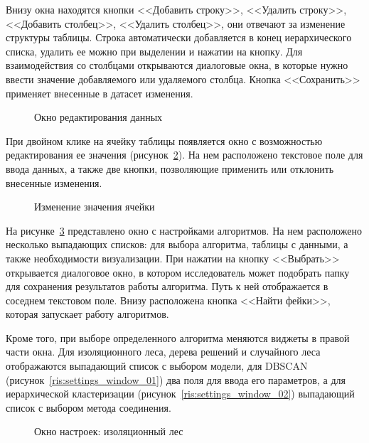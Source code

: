 Внизу окна находятся кнопки <<Добавить строку>>, <<Удалить строку>>, <<Добавить столбец>>, <<Удалить столбец>>, они отвечают за изменение структуры таблицы. Строка автоматически добавляется в конец иерархического списка, удалить ее можно при выделении и нажатии на кнопку. Для взаимодействия со столбцами открываются диалоговые окна, в которые нужно ввести значение добавляемого или удаляемого столбца. Кнопка <<Сохранить>> применяет внесенные в датасет изменения. 

\begin{figure}[H]
    \caption{Окно редактирования данных}
    \label{ris:edit_window}
\end{figure}


При двойном клике на ячейку таблицы появляется окно с возможностью редактирования ее значения (рисунок~\ref{ris:edit_cell}). На нем расположено текстовое поле для ввода данных, а также две кнопки, позволяющие применить или отклонить внесенные изменения.


\begin{figure}[H]
    \caption{Изменение значения ячейки}
    \label{ris:edit_cell}
\end{figure}


На рисунке~\ref{ris:settings_window} представлено окно с настройками алгоритмов. На нем расположено несколько выпадающих списков: для выбора алгоритма, таблицы с данными, а также необходимости визуализации. При нажатии на кнопку <<Выбрать>> открывается диалоговое окно, в котором исследователь может подобрать папку для сохранения результатов работы алгоритма. Путь к ней отображается в соседнем текстовом поле. Внизу расположена кнопка <<Найти фейки>>, которая запускает работу алгоритмов.

Кроме того, при выборе определенного алгоритма меняются виджеты в правой части окна. Для изоляционного леса, дерева решений и случайного леса отображаются выпадающий список с выбором модели, для DBSCAN (рисунок~\ref{ris:settings_window_01}) два поля для ввода его параметров, а для иерархической кластеризации (рисунок~\ref{ris:settings_window_02}) выпадающий список с выбором метода соединения.


\begin{figure}[H]
    \caption{Окно настроек: изоляционный лес}
    \label{ris:settings_window}
\end{figure}


